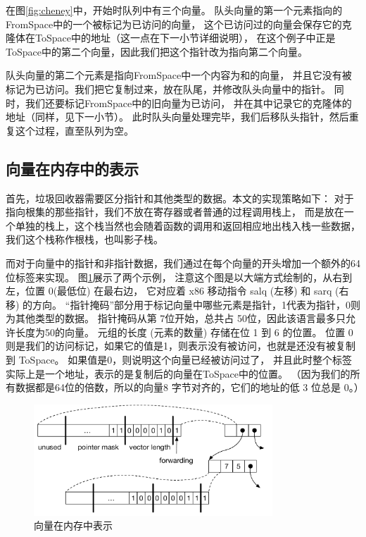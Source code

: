 在图\ref{fig:cheney}中，开始时队列中有三个向量。
队头向量的第一个元素指向的FromSpace中的一个被标记为已访问的向量，
这个已访问过的向量会保存它的克隆体在ToSpace中的地址（这一点在下一小节详细说明），
在这个例子中正是ToSpace中的第二个向量，因此我们把这个指针改为指向第二个向量。

队头向量的第二个元素是指向FromSpace中一个内容为和的向量，
并且它没有被标记为已访问。我们把它复制过来，放在队尾，并修改队头向量中的指针。
同时，我们还要标记FromSpace中的旧向量为已访问，
并在其中记录它的克隆体的地址（同样，见下一小节）。
此时队头向量处理完毕，我们后移队头指针，然后重复这个过程，直至队列为空。


\subsection{向量在内存中的表示}

首先，垃圾回收器需要区分指针和其他类型的数据。本文的实现策略如下：
对于指向根集的那些指针，我们不放在寄存器或者普通的过程调用栈上，
而是放在一个单独的栈上，这个栈当然也会随着函数的调用和返回相应地出栈入栈一些数据，
我们这个栈称作根栈，也叫影子栈。

而对于向量中的指针和非指针数据，我们通过在每个向量的开头增加一个额外的64位标签来实现。
图\ref{fig:tuple-rep}展示了两个示例，
注意这个图是以大端方式绘制的，从右到左，位置 0(最低位) 在最右边，
它对应着 x86 移动指令 salq (左移) 和 sarq (右移) 的方向。
“指针掩码”部分用于标记向量中哪些元素是指针，1代表为指针，0则为其他类型的数据。
指针掩码从第 7位开始，总共占 50位，因此该语言最多只允许长度为50的向量。
元组的长度 (元素的数量) 存储在位 1 到 6 的位置。
位置 0 则是我们的访问标记，如果它的值是1，则表示没有被访问，也就是还没有被复制到 ToSpace。
如果值是0，则说明这个向量已经被访问过了，
并且此时整个标签实际上是一个地址，表示的是复制后的向量在ToSpace中的位置。
（因为我们的所有数据都是64位的倍数，所以的向量8 字节对齐的，它们的地址的低 3 位总是 0。）

\begin{figure}[t]
\centering
\includegraphics[width=0.8\textwidth]{figures/tuple-rep}
\caption{向量在内存中表示}
\label{fig:tuple-rep}
\end{figure}


